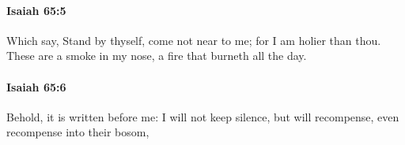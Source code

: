 		\paragraph{Isaiah 65:5} %
			\label{ISAIAH-65-5}

			Which say, Stand by thyself, come not near to me; for I am holier than thou. These are a smoke in my nose, a fire that burneth all the day.


		\paragraph{Isaiah 65:6} %
			\label{ISAIAH-65-6}

			Behold, it is written before me: I will not keep silence, but will recompense, even recompense into their bosom,


